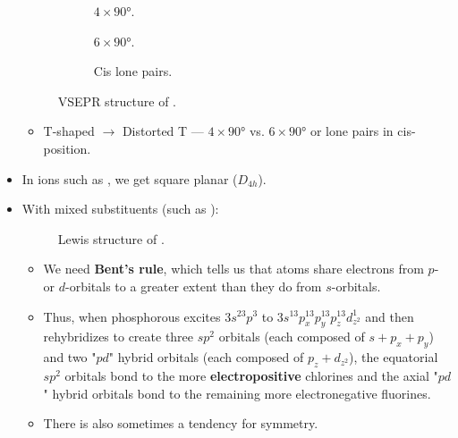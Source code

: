 \documentclass[../notes.tex]{subfiles}
\begin{document}
\begin{itemize}
\begin{figure}[h!]
\begin{subfigure}[b]{0.2\linewidth}
            \caption{$4\times\ang{90}$.}
            \label{fig:VSEPR-BrF3a}
        \end{subfigure}
        \begin{subfigure}[b]{0.2\linewidth}
            \centering
            \caption{$6\times\ang{90}$.}
            \label{fig:VSEPR-BrF3b}
        \end{subfigure}
        \begin{subfigure}[b]{0.2\linewidth}
            \centering
            \caption{Cis lone pairs.}
            \label{fig:VSEPR-BrF3c}
        \end{subfigure}
        \caption{VSEPR structure of .}
        \label{fig:VSEPR-BrF3}
    \end{figure}
    \begin{itemize}
        \item T-shaped $\to$ Distorted T --- $4\times\ang{90}$ vs. $6\times\ang{90}$ or lone pairs in cis-position.
    \end{itemize}
    \item In ions such as , we get square planar ($D_{4h}$).
    \item With mixed substituents (such as ):
    \begin{figure}[h!]
        \centering
        \caption{Lewis structure of .}
        \label{fig:Lewis-PF2Cl3}
    \end{figure}
    \begin{itemize}
        \item We need \textbf{Bent's rule}, which tells us that atoms share electrons from $p$- or $d$-orbitals to a greater extent than they do from $s$-orbitals.
        \item Thus, when phosphorous excites $3s^23p^3$ to $3s^13p_x^13p_y^13p_z^13d_{z^2}^1$ and then rehybridizes to create three $sp^2$ orbitals (each composed of $s+p_x+p_y$) and two "$pd$" hybrid orbitals (each composed of $p_z+d_{z^2}$), the equatorial $sp^2$ orbitals bond to the more \textbf{electropositive} chlorines and the axial "$pd$" hybrid orbitals bond to the remaining more electronegative fluorines.
        \item There is also sometimes a tendency for symmetry.

\end{itemize}
\end{itemize}
\end{document}
